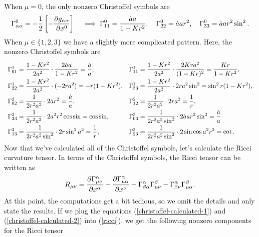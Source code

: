 \documentclass{lkx_pset}
\begin{document}
\begin{solution}
	When $\mu=0$, the only nonzero Christoffel symbols are
	\begin{equation}\label{christoffel-calculated-1}
		\Gamma^0_{\alpha\alpha} = -\frac{1}{2}\left[-\frac{\partial g_{\alpha\alpha}}{\partial x^0}\right]\quad \implies \Gamma^0_{11} = \frac{\dot{a}a}{1-Kr^2}, \quad \Gamma^0_{22}=\dot{a}a r^2,\quad \Gamma^0_{33}=\dot{a}ar^2\sin^2.
	\end{equation}
	When $\mu\in \{1,2,3\}$ we have a slightly more complicated pattern. Here, the nonzero Christoffel symbols are
	\begin{equation}\label{christoffel-calculated-2}
		\everymath={\displaystyle}
		\renewcommand*{\arraystretch}{2}
		\begin{array}{ll}
			\Gamma^1_{01} = \frac{1-Kr^2}{2a^2}\cdot \frac{2\dot{a}a}{1-Kr^2} = \frac{\dot{a}}{a},
			 & \Gamma^1_{11} = \frac{1-Kr^2}{2a^2}\cdot\frac{2Kra^2}{(1-Kr)^2} = \frac{Kr}{1-Kr^2}, \\
			\Gamma^1_{22} = \frac{1-Kr^2}{2a^2}\cdot(-2ra^2) =-r(1-Kr^2),
			 & \Gamma^1_{33} = \frac{1-Kr^2}{2a^2}\cdot 2ra^2\sin^2 = \sin^2r(1-Kr^2),              \\
			\Gamma^2_{02} = \frac{1}{2r^2a^2}\cdot 2\dot{a}r^2 = \frac{\dot{a}}{a},
			 & \Gamma^2_{12} = \frac{1}{2r^2a^2}\cdot 2ra^2 = \frac{1}{r},                          \\
			\Gamma^2_{33} = \frac{1}{2r^2a^2}\cdot 2a^2r^2\cos\sin=\cos\sin,
			 & \Gamma^3_{03} = \frac{1}{2r^2a^2\sin^2}\cdot 2\dot{a}a r^2\sin^2 = \frac{\dot{a}}{a} \\
			\Gamma^3_{13} = \frac{1}{2r^2a^2\sin^2}\cdot 2r\sin^2 a^2 = \frac{1}{r},
			 & \Gamma^3_{23} = \frac{1}{2r^2a^2\sin^2}\cdot 2\sin\cos a^2r^2 = \cot.                \\
		\end{array}
	\end{equation}
	Now that we've calculated all of the Christoffel symbols, let's calculate the Ricci curvature tensor. In terms of the Christoffel symbols, the Ricci tensor can be written as
	\begin{equation}\label{ricci}
		R_{\mu\nu} = \frac{\partial \Gamma^\alpha_{\mu\nu}}{\partial x^\alpha} - \frac{\partial \Gamma^\alpha_{\mu\alpha}}{\partial x^\nu} + \Gamma^\alpha_{\beta\alpha}\Gamma^\beta_{\mu\nu} - \Gamma^\alpha_{\beta\nu} \Gamma^\beta_{\mu\alpha}.
	\end{equation}
	At this point, the computations get a bit tedious, so we omit the details and only state the results.
	If we plug the equations (\ref{christoffel-calculated-1}) and (\ref{christoffel-calculated-2}) into (\ref{ricci}), we get the following nonzero components for the Ricci tensor

\end{solution}
\end{document}
